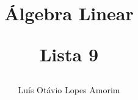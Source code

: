 \documentclass[a4paper, 12pt]{article}
\title{Álgebra Linear

Lista 9}
\author{Luís Otávio Lopes Amorim}
\begin{document}
\maketitle

\begin{enumerate}







\end{enumerate}
\end{document}
